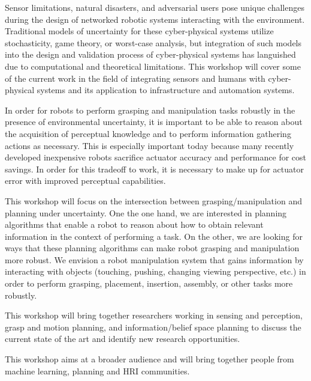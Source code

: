 \begin{spacing}{1.0}
{
Sensor limitations, natural disasters, and adversarial users pose unique challenges during the design of networked robotic systems interacting with the environment. Traditional models of uncertainty for these cyber-physical systems utilize stochasticity, game theory, or worst-case analysis, but integration of such models into the design and validation process of cyber-physical systems has languished due to computational and theoretical limitations. This workshop will cover some of the current work in the field of integrating sensors and humans with cyber-physical systems and its application to infrastructure and automation systems.
}



{
In order for robots to perform grasping and manipulation tasks robustly in the presence of environmental uncertainty, it is important to be able to reason about the acquisition of perceptual knowledge and to perform information gathering actions as necessary. This is especially important today because many recently developed inexpensive robots sacrifice actuator accuracy and performance for cost savings. In order for this tradeoff to work, it is necessary to make up for actuator error with improved perceptual capabilities.

This workshop will focus on the intersection between grasping/manipulation and planning under uncertainty. One the one hand, we are interested in planning algorithms that enable a robot to reason about how to obtain relevant information in the context of performing a task. On the other, we are looking for ways that these planning algorithms can make robot grasping and manipulation more robust. We envision a robot manipulation system that gains information by interacting with objects (touching, pushing, changing viewing perspective, etc.) in order to perform grasping, placement, insertion, assembly, or other tasks more robustly.

This workshop will bring together researchers working in sensing and perception, grasp and motion planning, and information/belief space planning to discuss the current state of the art and identify new research opportunities.


}


{
This workshop aims at a broader audience and will bring together people from machine learning, planning and HRI communities.

}
\end{spacing}
